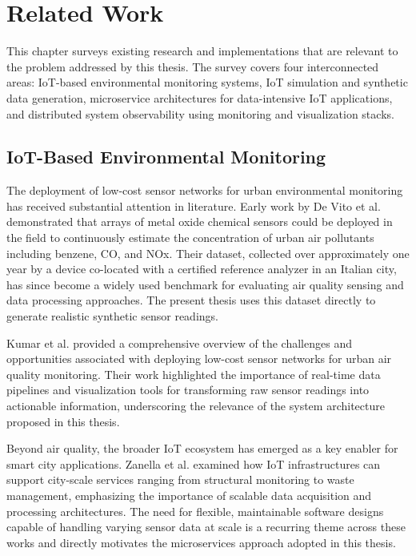 \chapter{Related Work} \label{ch:related_work}

This chapter surveys existing research and implementations that are relevant to the problem addressed by this thesis. The survey covers four interconnected areas: IoT-based environmental monitoring systems, IoT simulation and synthetic data generation, microservice architectures for data-intensive IoT applications, and distributed system observability using monitoring and visualization stacks.

\section{IoT-Based Environmental Monitoring}

The deployment of low-cost sensor networks for urban environmental monitoring has received substantial attention in literature. Early work by De Vito et al.\cite{devito2008} demonstrated that arrays of metal oxide chemical sensors could be deployed in the field to continuously estimate the concentration of urban air pollutants including benzene, CO, and NOx. Their dataset, collected over approximately one year by a device co-located with a certified reference analyzer in an Italian city, has since become a widely used benchmark for evaluating air quality sensing and data processing approaches. The present thesis uses this dataset directly to generate realistic synthetic sensor readings.

Kumar et al.\cite{Kumar2015} provided a comprehensive overview of the challenges and opportunities associated with deploying low-cost sensor networks for urban air quality monitoring. Their work highlighted the importance of real-time data pipelines and visualization tools for transforming raw sensor readings into actionable information, underscoring the relevance of the system architecture proposed in this thesis.

Beyond air quality, the broader IoT ecosystem has emerged as a key enabler for smart city applications. Zanella et al.\cite{zanella2014} examined how IoT infrastructures can support city-scale services ranging from structural monitoring to waste management, emphasizing the importance of scalable data acquisition and processing architectures. The need for flexible, maintainable software designs capable of handling varying sensor data at scale is a recurring theme across these works and directly motivates the microservices approach adopted in this thesis.

